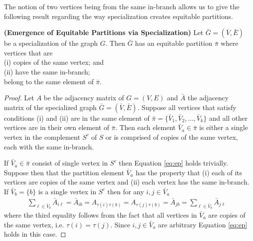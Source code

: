 \documentclass[12pt]{thesis}
\begin{document}
The notion of two vertices being from the same in-branch allows us to give the following result regarding the way specialization creates equitable partitions.

\begin{theorem}{\textbf{(Emergence of Equitable Partitions via Specialization)}}\label{thm:coarse}
Let $\bar{G}=(\bar{V},\bar{E})$ be a specialization of the graph $G$.
Then $\bar{G}$ has an equitable partition $\bar{\pi}$ where vertices that are\\
(i) copies of the same vertex; and\\
(ii) have the same in-branch;\\
belong to the same element of $\bar{\pi}$.
\end{theorem}

\begin{proof}
Let $A$ be the adjacency matrix of $G=(V,E)$ and $\bar{A}$ the adjacency matrix of the specialized graph $\bar{G}=(\bar{V},\bar{E})$.
Suppose all vertices that satisfy conditions (i) and (ii) are in the same element of $\bar{\pi}=\{\bar{V}_1,\bar{V}_2,\dots,\bar{V}_k\}$ and all other vertices are in their own element of $\bar{\pi}$.
Then each element $\bar{V}_a\in\bar{\pi}$ is either a single vertex in the {complement} $S^c$ of $S$ or is comprised of copies of the same vertex, each with the same in-branch. 

If $\bar{V}_a\in\bar{\pi}$ consist of single vertex in $S^c$ then Equation \eqref{eq:ep} holds trivially.
Suppose then that the partition element $\bar{V}_a$ has the property that (i) each of its vertices are copies of the same vertex and (ii) each vertex has the same in-branch.
If $\bar{V}_b=\{b\}$ is a single vertex in $S^c$ then for any $i,j\in\bar{V}_a$
\begin{align*}
    \sum_{\ell\in \bar{V}_b}\bar{A}_{i\ell}=\bar{A}_{ib}=A_{\tau(i)\tau(b)}=A_{\tau(j)\tau(b)}=\bar{A}_{jb}=\sum_{\ell\in \bar{V}_b}\bar{A}_{j\ell}
\end{align*}
where the third equality follows from the fact that all vertices in $\bar{V}_a$ are copies of the same vertex, i.e. $\tau(i)=\tau(j)$. Since $i,j\in\bar{V}_a$ are arbitrary Equation \eqref{eq:ep} holds in this case. 


\end{proof}
\end{document}
